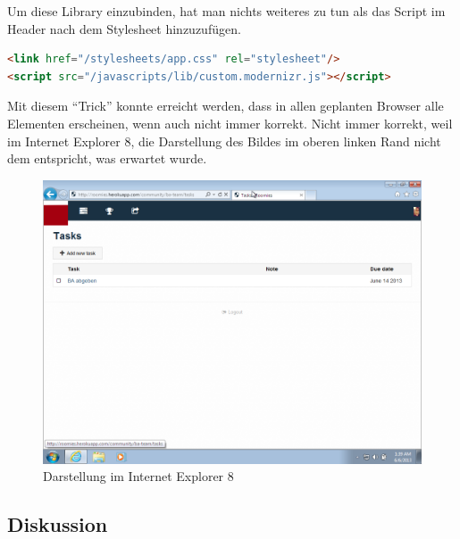 Um diese Library einzubinden, hat man nichts weiteres zu tun als das Script im Header nach dem Stylesheet hinzuzufügen.

\begin{lstlisting}[language=HTML, caption=Einbinden von modernizr \cite{roomiesLayout}, firstnumber=11, label=lst:mdernizrLayoutServer]
<link href="/stylesheets/app.css" rel="stylesheet"/>
<script src="/javascripts/lib/custom.modernizr.js"></script>
\end{lstlisting}

Mit diesem ``Trick'' konnte erreicht werden, dass in allen geplanten Browser alle Elementen erscheinen, wenn auch nicht immer korrekt. Nicht immer korrekt, weil im Internet Explorer 8, die Darstellung des Bildes im oberen linken Rand nicht dem entspricht, was erwartet wurde.

\begin{figure}[H]
	\centering
	\includegraphics[width=12cm]{content/principle-demonstration/images/progressive-enhancement-ie8.png}
	\caption{Darstellung im Internet Explorer 8}
	\label{fig:iossafari-datepicker}
\end{figure}

\subsection*{Diskussion}

